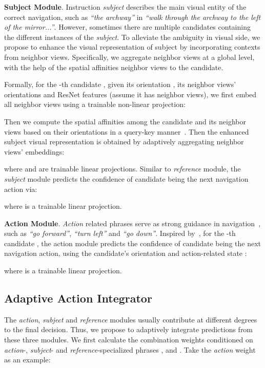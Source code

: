 \documentclass[sigconf]{acmart}
\begin{document}
\vspace{1mm}
\noindent\textbf{Subject Module}. Instruction \textit{subject} describes the main visual entity of the correct navigation, such as \textit{``the archway''} in \textit{``walk through the archway to the left of the mirror...''}. 
However, sometimes there are multiple candidates containing the different instances of the \textit{subject}.
To alleviate the ambiguity in visual side, we propose to enhance the visual representation of subject by incorporating contexts from neighbor views.
Specifically, we aggregate neighbor views at a global level, with the help of the spatial affinities neighbor views to the candidate.


Formally, for the -th candidate , given its orientation , its neighbor views' orientations  and  ResNet features  (assume it has  neighbor views), we first embed all neighbor views using a trainable non-linear projection:

Then we compute the spatial affinities among the candidate and its neighbor views based on their orientations in a query-key manner~\cite{ashish2017transformer}. Then the enhanced subject visual representation  is obtained by adaptively aggregating neighbor views' embeddings:

where  and  are trainable linear projections. 
Similar to \textit{reference} module, the \textit{subject} module predicts the confidence of candidate  being the next navigation action via: 

where  is a trainable linear projection.

\vspace{1mm}
\noindent\textbf{Action Module}. \textit{Action} related phrases serve as strong guidance in navigation~\cite{hu2019looking,qi2020oaam}, such as \textit{``go forward''}, \textit{``turn left''} and \textit{``go down''}. Inspired by~\cite{qi2020oaam}, for the -th candidate , the action module predicts the confidence of candidate  being the next navigation action, using the candidate's orientation  and action-related state :

where  is a trainable linear projection.

\subsection{Adaptive Action Integrator}\label{sec_integrator}
The \textit{action}, \textit{subject} and \textit{reference} modules usually contribute at different degrees to the final decision.
Thus, we propose to adaptively integrate predictions from these three modules. We first calculate the combination weights conditioned on \textit{action}-, \textit{subject}- and \textit{reference}-specialized phrases ,  and . 
Take the \textit{action} weight  as an example:
 
\end{document}
